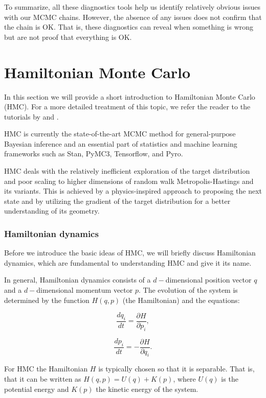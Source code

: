 \documentclass{book}
\theoremstyle{plain}%
\theoremstyle{definition}
\begin{document}
To summarize, all these diagnostics tools help us identify relatively obvious issues with our MCMC chains. However, the absence of any issues does not confirm that the chain is OK. That is, these diagnostics can reveal when something is wrong but are not proof that everything is OK.

\section{Hamiltonian Monte Carlo}

In this section we will provide a short introduction to Hamiltonian Monte Carlo (HMC). For a more detailed treatment of this topic, we refer the reader to the tutorials by \cite{Neal2011} and  \cite{Betancourt2017}.

HMC is currently the state-of-the-art MCMC method for general-purpose Bayesian inference and an essential part of statistics and machine learning frameworks such as Stan, PyMC3, Tensorflow, and Pyro.

HMC deals with the relatively inefficient exploration of the target distribution and poor scaling to higher dimensions of random walk Metropolis-Hastings and its variants. This is achieved by a physics-inspired approach to proposing the next state and by utilizing the gradient of the target distribution for a better understanding of its geometry.

\subsubsection*{Hamiltonian dynamics}

Before we introduce the basic ideas of HMC, we will briefly discuss Hamiltonian dynamics, which are fundamental to understanding HMC and give it its name.

In general, Hamiltonian dynamics consists of a $d-$dimensional position vector $q$ and a $d-$dimensional momentum vector $p$. The evolution of the system is determined by the function $H(q, p)$ (the Hamiltonian) and the equations:

$$\frac{dq_i}{dt} = \frac{\partial H}{\partial p_i},$$

$$\frac{dp_i}{dt} = -\frac{\partial H}{\partial q_i}.$$

For HMC the Hamiltonian $H$ is typically chosen so that it is separable. That is, that it can be written as $H(q,p) = U(q) + K(p)$, where $U(q)$ is the potential energy and $K(p)$ the kinetic energy of the system.
\end{document}
